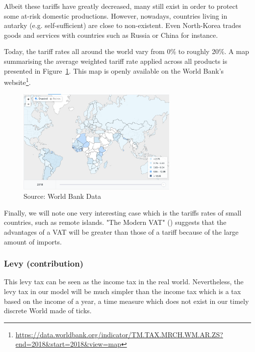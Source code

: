    Albeit these tariffs have greatly decreased, many still exist in order to protect some at-risk domestic productions. However, nowadays, countries living in autarky (e.g. self-sufficient) are close to non-existent. Even North-Korea trades goods and services with countries such as Russia or China for instance.
    
    Today, the tariff rates all around the world vary from 0\% to roughly 20\%. A map summarising the average weighted tariff rate applied across all products is presented in Figure~\ref{fig:world_bank_tariffs}. This map is openly available on the World Bank's website\footnote{\url{https://data.worldbank.org/indicator/TM.TAX.MRCH.WM.AR.ZS?end=2018&start=2018&view=map}}.
    
    \begin{figure}[H]
        \centering
        \includegraphics[width=0.7\textwidth]{img/world_bank_tariffs.jpg}
        \caption{Source: World Bank Data}
        \label{fig:world_bank_tariffs}
    \end{figure}
    
    Finally, we will note one very interesting case which is the tariffs rates of small countries, such as remote islands. "The Modern VAT" (\cite{TheModernVAT}) suggests that the advantages of a VAT will be greater than those of a tariff because of the large amount of imports.
    
    
    \subsubsection{Levy (contribution)}
    
    This levy tax can be seen as the income tax in the real world. Nevertheless, the levy tax in our model will be much simpler than the income tax which is a tax based on the income of a year, a time measure which does not exist in our timely discrete World made of ticks.
    
